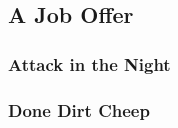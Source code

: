 

\subsection{A Job Offer}


\subsubsection{Attack in the Night}


\subsubsection{Done Dirt Cheep}

